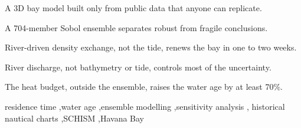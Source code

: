 \documentclass[a4paper,fleqn]{ems-dc}
\begin{document}
\begin{abstract}
Many polluted bays lack the surveys, tide and current records to calibrate
hydrodynamic models. We ask which conclusions about flushing survive without them.
Havana Bay (Cuba), a 4.9~km$^2$ pocket bay with a 1.5~km entrance channel, is modelled in
3D with SCHISM from public inputs only. Nine poorly known inputs, from
historical charts to river discharge, are sampled in a 704-member Sobol ensemble.
The tide alone exchanges little water; the density contrast of 2~m$^3$\,s$^{-1}$ of river
water does. Within the ensemble the bay-mean age is 7.8~days (5.6--10.4,
90\% range), never above 14~days; ageing from the channel to the inner coves is robust,
an age above one week is not. River discharge explains most of the variance and should be
measured first. The air--sea heat budget, not sampled, raises the age to at least 11~days:
the bay is renewed in one to two weeks, not months.
\end{abstract}

\begin{highlights}
\item A 3D bay model built only from public data that anyone can replicate.
\item A 704-member Sobol ensemble separates robust from fragile conclusions.
\item River-driven density exchange, not the tide, renews the bay in one to two weeks.
\item River discharge, not bathymetry or tide, controls most of the uncertainty.
\item The heat budget, outside the ensemble, raises the water age by at least 70\%.
\end{highlights}

\begin{keywords}
residence time \sep water age \sep ensemble modelling \sep sensitivity analysis \sep
historical nautical charts \sep SCHISM \sep Havana Bay
\end{keywords}

\maketitle

\end{document}
